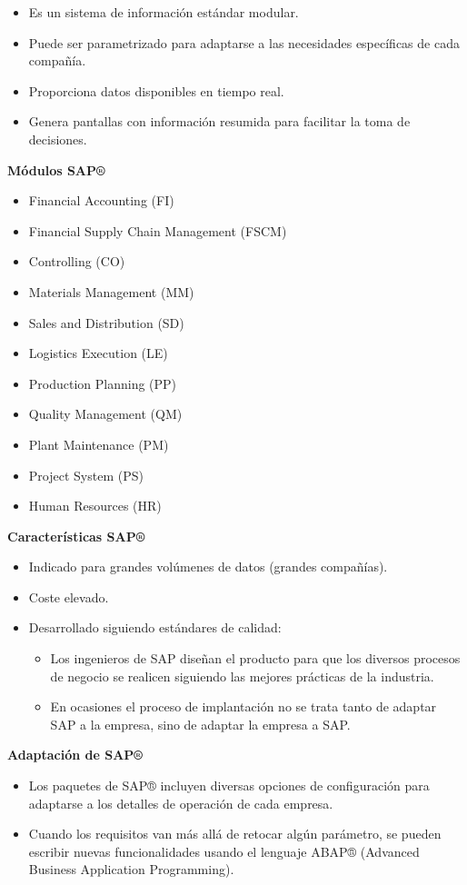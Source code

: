 \documentclass[12pt]{book} %
\begin{document}
\begin{definicion}

\begin{itemize}
    \item Es un sistema de información estándar modular.
    \item Puede ser parametrizado para adaptarse a las necesidades específicas de cada compañía.
    \item Proporciona datos disponibles en tiempo real.
    \item Genera pantallas con información resumida para facilitar la toma de decisiones.
\end{itemize}

\textbf{Módulos SAP®}

\begin{itemize}
\item Financial Accounting (FI)
\item Financial Supply Chain Management (FSCM)
\item Controlling (CO)
\item Materials Management (MM)
\item Sales and Distribution (SD)
\item Logistics Execution (LE)
\item Production Planning (PP)
\item Quality Management (QM)
\item Plant Maintenance (PM)
\item Project System (PS)
\item Human Resources (HR)
\end{itemize}

\textbf{Características SAP®}

\begin{itemize}
\item Indicado para grandes volúmenes de datos (grandes compañías).
\item Coste elevado.
\item Desarrollado siguiendo estándares de calidad:
    \begin{itemize}
    \item Los ingenieros de SAP diseñan el producto para que los diversos procesos de negocio se realicen siguiendo las mejores prácticas de la industria.
    \item En ocasiones el proceso de implantación no se trata tanto de adaptar SAP a la empresa, sino de adaptar la empresa a SAP.
    \end{itemize}
\end{itemize}

\textbf{Adaptación de SAP®}

\begin{itemize}
\item Los paquetes de SAP® incluyen diversas opciones de configuración para adaptarse a los detalles de operación de cada empresa.
\item Cuando los requisitos van más allá de retocar algún parámetro, se pueden escribir nuevas funcionalidades usando el lenguaje ABAP® (Advanced Business Application Programming).
\end{itemize}
\end{definicion}
\end{document}
